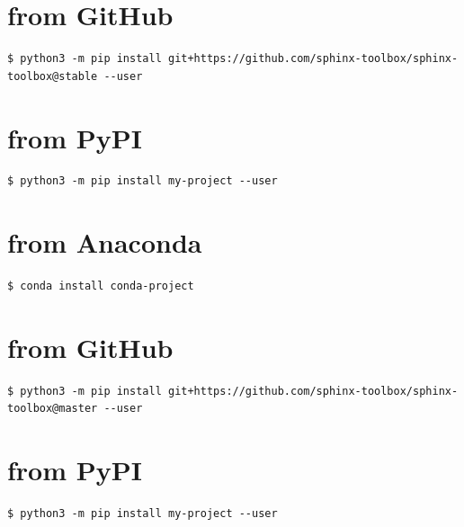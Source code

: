 \documentclass[letterpaper,10pt,english]{sphinxmanual}
\begin{document}
\chapter{from GitHub}
\label{\detokenize{installation:installation-15-from_GitHub}}
\begin{Verbatim}[commandchars=\\\{\}]
$ python3 -m pip install git+https://github.com/sphinx-toolbox/sphinx-toolbox@stable --user
\end{Verbatim}


\chapter{from PyPI}
\label{\detokenize{installation:installation-16-from_PyPI}}\label{\detokenize{installation:installation-16}}
\begin{Verbatim}[commandchars=\\\{\}]
$ python3 -m pip install my-project --user
\end{Verbatim}


\chapter{from Anaconda}
\label{\detokenize{installation:installation-16-from_Anaconda}}
\begin{Verbatim}[commandchars=\\\{\}]
$ conda install conda-project
\end{Verbatim}


\chapter{from GitHub}
\label{\detokenize{installation:installation-16-from_GitHub}}
\begin{Verbatim}[commandchars=\\\{\}]
$ python3 -m pip install git+https://github.com/sphinx-toolbox/sphinx-toolbox@master --user
\end{Verbatim}


\chapter{from PyPI}
\label{\detokenize{installation:installation-17-from_PyPI}}\label{\detokenize{installation:installation-17}}
\begin{Verbatim}[commandchars=\\\{\}]
$ python3 -m pip install my-project --user
\end{Verbatim}
\end{document}
